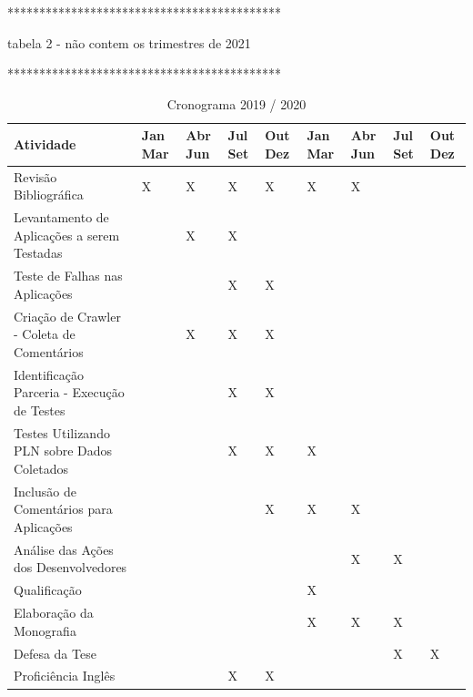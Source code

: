*******************************************

tabela 2 - não contem os trimestres de 2021

*******************************************


\begin{table}[htbp]
	\centering
	\caption{Cronograma 2019 / 2020}
	\label{tab:Cronograma}
	\begin{tabular}{p{3.40in} p{0.20in} p{0.20in} p{0.20in} p{0.20in} p{0.20in} p{0.20in} p{0.20in} p{0.20in}} \hline
		\textbf{Atividade}							& Jan Mar & Abr Jun & Jul Set & Out Dez & Jan Mar & Abr Jun & Jul Set & Out Dez \\ \hline
		Revisão Bibliográfica						& X		  & X 	 	& X		  & X  		& X  	  & X  		&         & 	    \\ 
		Levantamento de Aplicações a serem Testadas	& 		  & X	    & X		  &    		&  		  &  	    & 		  & 	    \\ 
		Teste de Falhas nas Aplicações	  			&  		  & 	    & X		  & X		&    	  &  	    &  	      & 		\\ 
		Criação de Crawler - Coleta de Comentários	&  		  & X       & X		  & X		&    	  &  	    &  	      & 		\\ 
		Identificação Parceria - Execução de Testes	&  		  & 	    & X		  & X		&    	  &  	    &  	      & 		\\ 
		Testes Utilizando PLN sobre Dados Coletados &  		  & 	    & X		  & X		& X  	  &  	    &  	      & 		\\
		Inclusão de Comentários para Aplicações		&  		  & 	    &  		  & X		& X  	  & X	    &  	      & 		\\
		Análise das Ações dos Desenvolvedores		&  		  & 	    &  		  &  		&    	  & X	    & X	      & 		\\ \hline
		Qualificação								&  		  & 	    &  		  &  		& X  	  &  	    &  	      & 		\\
		Elaboração da Monografia					&  		  & 	    &  		  &  		& X  	  & X	    & X	      & 		\\
		Defesa da Tese								&  		  & 	    &  		  &  		&    	  &  	    & X	      & X   	\\ \hline
		Proficiência Inglês							&  		  & 	    & X		  & X		&    	  &  	    &  	      & 		\\
	\end{tabular}
\end{table}



